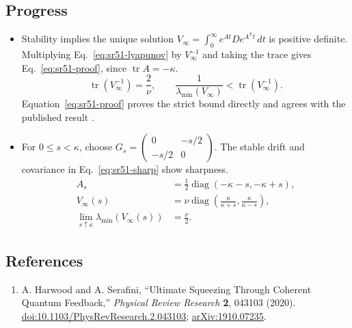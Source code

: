 \subsection*{Progress}

\begin{itemize}
  \item Stability implies the unique solution $V_\infty=\int_0^\infty e^{At}D e^{A^{\mathsf T}t}\,dt$ is positive definite. Multiplying Eq.~\eqref{eq:sr51-lyapunov} by $V_\infty^{-1}$ and taking the trace gives Eq.~\eqref{eq:sr51-proof}, since $\operatorname{tr}A=-\kappa$.
\begin{equation}
\operatorname{tr}(V_\infty^{-1})=\frac2\nu,\qquad \frac1{\lambda_{\min}(V_\infty)}<\operatorname{tr}(V_\infty^{-1}).
\label{eq:sr51-proof}
\end{equation}
Equation~\eqref{eq:sr51-proof} proves the strict bound directly and agrees with the published result .

  \item For $0\leq s<\kappa$, choose $G_s=\begin{pmatrix}0&-s/2\\-s/2&0\end{pmatrix}$. The stable drift and covariance in Eq.~\eqref{eq:sr51-sharp} show sharpness.
\begin{equation}
\begin{aligned}
 A_s&=\frac12\operatorname{diag}(-\kappa-s,-\kappa+s),\\
 V_\infty(s)&=\nu\operatorname{diag}\!\left(\frac\kappa{\kappa+s},\frac\kappa{\kappa-s}\right),\\
 \lim_{s\uparrow\kappa}\lambda_{\min}(V_\infty(s))&=\frac\nu2.
\end{aligned}
\label{eq:sr51-sharp}
\end{equation}
\end{itemize}

\subsection*{References}

\begin{enumerate}[label={},leftmargin=4.8em,labelsep=0.5em]
  \footnotesize
  \item[\textup{[HS20]}]\label{ref:sr51-harwood}
  A. Harwood and A. Serafini, ``Ultimate Squeezing Through Coherent Quantum Feedback,'' \emph{Physical Review Research} \textbf{2}, 043103 (2020). \href{https://doi.org/10.1103/PhysRevResearch.2.043103}{doi:10.1103/PhysRevResearch.2.043103}; \href{https://arxiv.org/abs/1910.07235}{arXiv:1910.07235}.
\end{enumerate}

